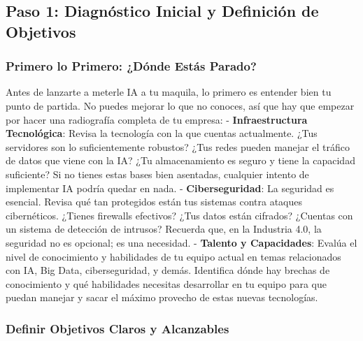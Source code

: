 \documentclass[
  10pt,
  letterpaper,
]{book}
\begin{document}
\subsection{Paso 1: Diagnóstico Inicial y Definición de
Objetivos}\label{paso-1-diagnuxf3stico-inicial-y-definiciuxf3n-de-objetivos}

\subsubsection{\texorpdfstring{\textbf{Primero lo Primero: ¿Dónde Estás
Parado?}}{Primero lo Primero: ¿Dónde Estás Parado?}}\label{primero-lo-primero-duxf3nde-estuxe1s-parado}

Antes de lanzarte a meterle IA a tu maquila, lo primero es entender bien
tu punto de partida. No puedes mejorar lo que no conoces, así que hay
que empezar por hacer una radiografía completa de tu empresa: -
\textbf{Infraestructura Tecnológica}: Revisa la tecnología con la que
cuentas actualmente. ¿Tus servidores son lo suficientemente robustos?
¿Tus redes pueden manejar el tráfico de datos que viene con la IA? ¿Tu
almacenamiento es seguro y tiene la capacidad suficiente? Si no tienes
estas bases bien asentadas, cualquier intento de implementar IA podría
quedar en nada. - \textbf{Ciberseguridad}: La seguridad es esencial.
Revisa qué tan protegidos están tus sistemas contra ataques
cibernéticos. ¿Tienes firewalls efectivos? ¿Tus datos están cifrados?
¿Cuentas con un sistema de detección de intrusos? Recuerda que, en la
Industria 4.0, la seguridad no es opcional; es una necesidad. -
\textbf{Talento y Capacidades}: Evalúa el nivel de conocimiento y
habilidades de tu equipo actual en temas relacionados con IA, Big Data,
ciberseguridad, y demás. Identifica dónde hay brechas de conocimiento y
qué habilidades necesitas desarrollar en tu equipo para que puedan
manejar y sacar el máximo provecho de estas nuevas tecnologías.

\subsubsection{\texorpdfstring{\textbf{Definir Objetivos Claros y
Alcanzables}}{Definir Objetivos Claros y Alcanzables}}\label{definir-objetivos-claros-y-alcanzables}
\end{document}
